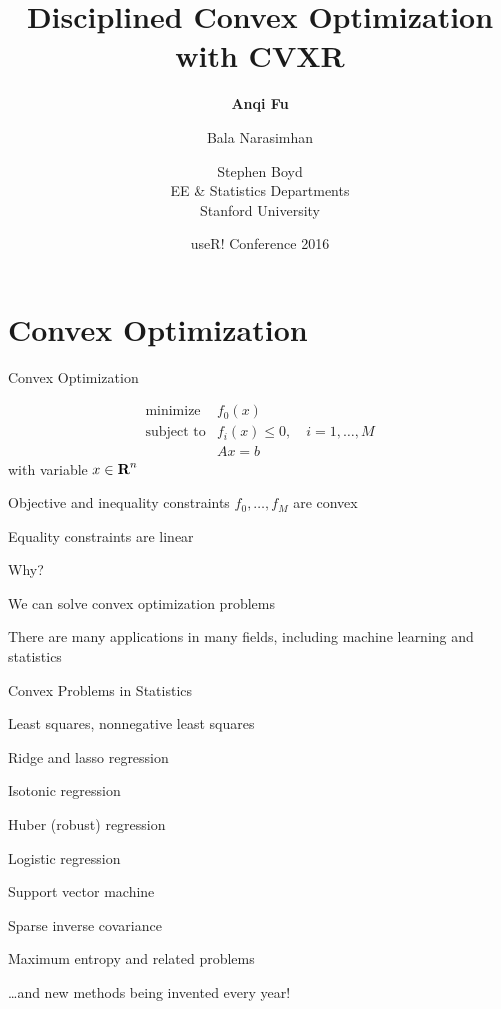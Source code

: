 \documentclass{beamer}
\title{Disciplined Convex Optimization with CVXR}
\author{\textbf{Anqi Fu} \and Bala Narasimhan \and Stephen Boyd \\[2ex]
	EE \& Statistics Departments\\[1ex]
	Stanford University}
\date{useR! Conference 2016}
\begin{document}
	
\begin{frame}
	\titlepage
\end{frame}

\begin{frame}
	\tableofcontents
\end{frame}

\section{Convex Optimization}

\begin{frame}{Convex Optimization}%
	
	\[
	\begin{array}{ll} \mbox{minimize} & f_0(x)\\
	\mbox{subject to} & f_i(x) \leq 0, \quad i=1, \ldots, M\\
	& Ax=b
	\end{array}
	\]
	with variable $x \in {\mbox{\bf R}}^n$
	
	\BIT
		\item Objective and inequality constraints $f_0, \ldots, f_M$ are convex %
		\item Equality constraints are linear
	\EIT
	\pause
	
	\vfill
	Why?
	\BIT
		\item We can solve convex optimization problems
		\item There are many applications in many fields, including machine learning and statistics
	\EIT
	
\end{frame}

\begin{frame}{Convex Problems in Statistics}
	\BIT
		\item Least squares, nonnegative least squares
		\item Ridge and lasso regression
		\item Isotonic regression
		\item Huber (robust) regression
		\item Logistic regression
		\item Support vector machine
		\item Sparse inverse covariance
		\item Maximum entropy and related problems
		\item \ldots and new methods being invented every year!
	\EIT
\end{frame}
\end{document}

